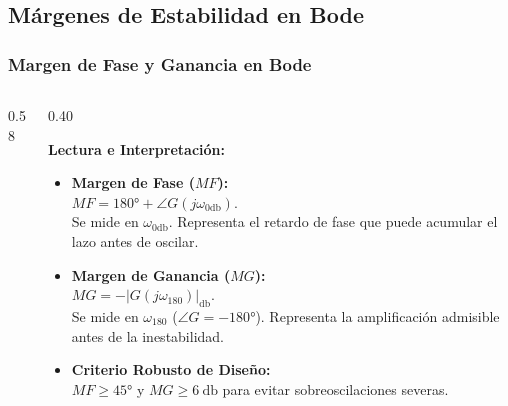\subsection{Márgenes de Estabilidad en Bode}
\begin{frame}
  \frametitle{Margen de Fase y Ganancia en Bode}

  \begin{columns}[c, onlytextwidth]
    \begin{column}{0.58\textwidth}
      \centering
    \end{column}

    \begin{column}{0.40\textwidth}
      \begin{tarjeta}
        {\fontsize{8.5pt}{10pt}\selectfont \textbf{\color{NavyDark} Lectura e Interpretación:}}\\[2pt]
        {\fontsize{7pt}{8.8pt}\selectfont
        \begin{itemize}\setlength{\itemsep}{2.5pt}
          \item \textbf{\color{BlueAccent} Margen de Fase ($MF$):}\\
          $MF = \ang{180} + \angle G(j\omega_{0\si{\decibel}})$.\\
          Se mide en $\omega_{0\si{\decibel}}$. Representa el retardo de fase que puede acumular el lazo antes de oscilar.
          \item \textbf{\color{AlertAmber} Margen de Ganancia ($MG$):}\\
          $MG = -|G(j\omega_{180})|_{\si{\decibel}}$.\\
          Se mide en $\omega_{180}$ ($\angle G = \ang{-180}$). Representa la amplificación admisible antes de la inestabilidad.
          \item \textbf{\color{AlertGreen} Criterio Robusto de Diseño:}\\
          $MF \ge \ang{45}$ y $MG \ge \qty{6}{\decibel}$ para evitar sobreoscilaciones severas.
        \end{itemize}
        }
      \end{tarjeta}
    \end{column}
  \end{columns}
\end{frame}


